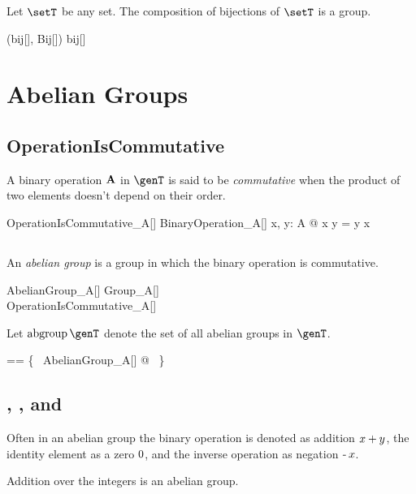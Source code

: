 \documentclass{amsart}
\begin{document}
\begin{example}
Let $\setT$ be any set.
The composition of bijections of $\setT$ is a group.

\begin{zed}
(bij[\setT], Bij[\setT]) \in \group bij[\setT]
\end{zed}

\end{example}

\section{Abelian Groups}

\subsection{OperationIsCommutative}

A binary operation $\mathbf{A}$ in $\genT$ is said to be {\em commutative} when the product of two elements doesn't depend on 
their order.

\begin{schema}{OperationIsCommutative\_A}[\genT]
	BinaryOperation\_A[\genT]
\where
	\forall x, y: A @ x \mulA y = y \mulA x
\end{schema}

\subsection{}

An {\em abelian group} is a group in which the binary operation is commutative.
\begin{schema}{AbelianGroup\_A}[\genT]
	Group\_A[\genT] \\
	OperationIsCommutative\_A[\genT]
\end{schema}

Let $\abgroup \genT$ denote the set of all abelian groups in $\genT$.
\begin{zed}
\abgroup \genT == \{~ AbelianGroup\_A[\genT] @ \strucA ~\}
\end{zed}

\subsection{, , and }

Often in an abelian group the binary operation is denoted as addition $x \mathbin{+} y$,
the identity element as a zero $0$, and the inverse operation as negation $\operatorname{-} x$.

\begin{example}
Addition over the integers is an abelian group.

\begin{zed}
	(\num, (\_ + \_)) \in \abgroup \num
\end{zed}

\end{example}

\printbibliography
\end{document}
